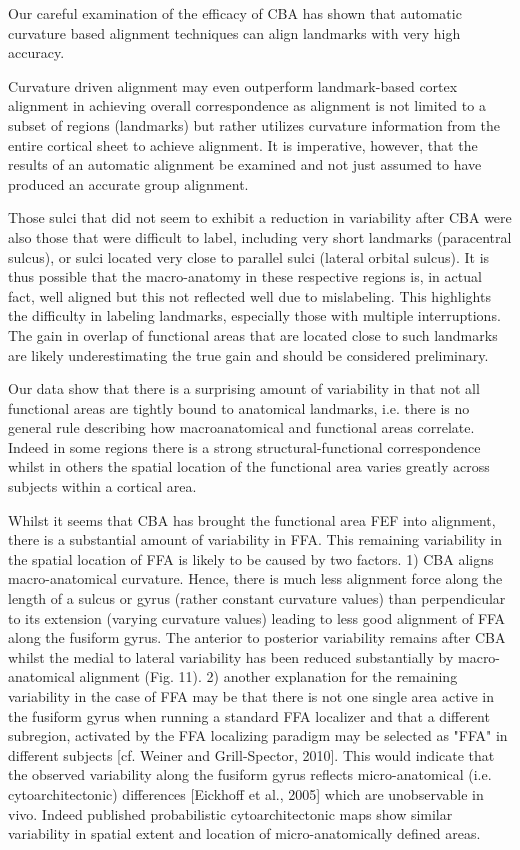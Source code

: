 %
Our careful examination of the efficacy of CBA has shown that automatic
curvature based alignment techniques can align landmarks with very high
accuracy.

%
Curvature driven alignment may even outperform landmark-based cortex
alignment in achieving overall correspondence as alignment is not limited to a
subset of regions (landmarks) but rather utilizes curvature information from the
entire cortical sheet to achieve alignment.
%
It is imperative, however, that the results of an automatic alignment be
examined and not just assumed to have produced an accurate group alignment.

%
Those sulci that did not seem to exhibit a reduction in variability after CBA
were also those that were difficult to label, including very short landmarks
(paracentral sulcus), or sulci located very close to parallel sulci (lateral
orbital sulcus).
%
It is thus possible that the macro-anatomy in these respective regions is, in
actual fact, well aligned but this not reflected well due to mislabeling.
%
This highlights the difficulty in labeling landmarks, especially those with
multiple interruptions.
%
The gain in overlap of functional areas that are located close to such landmarks
are likely underestimating the true gain and should be considered preliminary.

%
Our data show that there is a surprising amount of variability in that not all
functional areas are tightly bound to anatomical landmarks, i.e. there is no
general rule describing how macroanatomical and functional areas correlate.
%
Indeed in some regions there is a strong structural-functional correspondence
whilst in others the spatial location of the functional area varies greatly
across subjects within a cortical area.

%
Whilst it seems that CBA has brought the functional area FEF into alignment,
there is a substantial amount of variability in FFA.
%
This remaining variability in the spatial location of FFA is likely to be caused
by two factors.
%
1) CBA aligns macro-anatomical curvature.
%
Hence, there is much less alignment force along the length of a sulcus or gyrus
(rather constant curvature values) than perpendicular to its extension (varying
curvature values) leading to less good alignment of FFA along the fusiform
gyrus.
%
The anterior to posterior variability remains after CBA whilst the medial to
lateral variability has been reduced substantially by macro-anatomical alignment
(Fig. 11).
%
2) another explanation for the remaining variability in the case of FFA may be
that there is not one single area active in the fusiform gyrus when running a
standard FFA localizer and that a different subregion, activated by the FFA
localizing paradigm may be selected as "FFA" in different subjects [cf. Weiner
and Grill-Spector, 2010].
%
This would indicate that the observed variability along the fusiform gyrus
reflects micro-anatomical (i.e.  cytoarchitectonic) differences [Eickhoff et
al., 2005] which are unobservable in vivo.
%
Indeed published probabilistic cytoarchitectonic maps show similar variability
in spatial extent and location of micro-anatomically defined areas.

